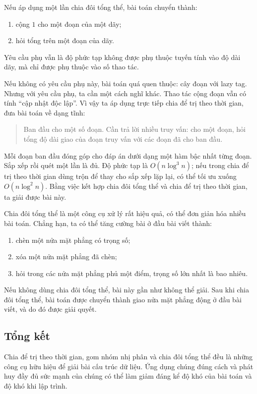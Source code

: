 \documentclass[11pt]{article}
\begin{document}
Nếu áp dụng một lần chia đôi tổng thể, bài toán chuyển thành:
\begin{enumerate}
  \item cộng \(1\) cho một đoạn của một dãy;
  \item hỏi tổng trên một đoạn của dãy.
\end{enumerate}
Yêu cầu phụ vẫn là độ phức tạp không được phụ thuộc tuyến tính vào độ dài
dãy, mà chỉ được phụ thuộc vào số thao tác.

Nếu không có yêu cầu phụ này, bài toán quá quen thuộc: cây đoạn với lazy
tag. Nhưng với yêu cầu phụ, ta cần một cách nghĩ khác. Thao tác cộng đoạn
vẫn có tính ``cập nhật độc lập''. Vì vậy ta áp dụng trực tiếp chia để trị
theo thời gian, đưa bài toán về dạng tĩnh:
\begin{quote}
Ban đầu cho một số đoạn. Cần trả lời nhiều truy vấn: cho một đoạn, hỏi tổng
độ dài giao của đoạn truy vấn với các đoạn đã cho ban đầu.
\end{quote}

Mỗi đoạn ban đầu đóng góp cho đáp án dưới dạng một hàm bậc nhất từng đoạn.
Sắp xếp rồi quét một lần là đủ. Độ phức tạp là \(O(n\log^3 n)\); nếu trong
chia để trị theo thời gian dùng trộn để thay cho sắp xếp lặp lại, có thể tối
ưu xuống \(O(n\log^2 n)\). Bằng việc kết hợp chia đôi tổng thể và chia để
trị theo thời gian, ta giải được bài này.

Chia đôi tổng thể là một công cụ xử lý rất hiệu quả, có thể đơn giản hóa
nhiều bài toán. Chẳng hạn, ta có thể tăng cường bài ở đầu bài viết thành:
\begin{enumerate}
  \item chèn một nửa mặt phẳng có trọng số;
  \item xóa một nửa mặt phẳng đã chèn;
  \item hỏi trong các nửa mặt phẳng phủ một điểm, trọng số lớn nhất là bao
  nhiêu.
\end{enumerate}
Nếu không dùng chia đôi tổng thể, bài này gần như không thể giải. Sau khi
chia đôi tổng thể, bài toán được chuyển thành giao nửa mặt phẳng động ở đầu
bài viết, và do đó được giải quyết.

\subsection{Tổng kết}

Chia để trị theo thời gian, gom nhóm nhị phân và chia đôi tổng thể đều là
những công cụ hữu hiệu để giải bài cấu trúc dữ liệu. Ứng dụng chúng đúng
cách và phát huy đầy đủ sức mạnh của chúng có thể làm giảm đáng kể độ khó
của bài toán và độ khó khi lập trình.
\end{document}
